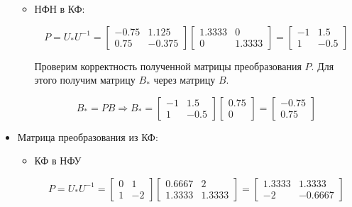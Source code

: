 \begin{itemize}
\begin{itemize}
	
	
	\item НФН в КФ:
	
	\begin{equation*}
	\text{$P=U_{*}U^{-1}=
	\begin{bmatrix}  -0.75  &  1.125 \\
    0.75  & -0.375 \end{bmatrix}
\begin{bmatrix} 1.3333   &      0 \\
         0  &  1.3333 \end{bmatrix}
=\begin{bmatrix}   -1 &    1.5 \\
    1  & -0.5 \end{bmatrix}$}
	\end{equation*}
	
	Проверим корректность полученной матрицы преобразования $P$. Для этого получим матрицу $B_{*}$ через матрицу $B$.
	
	\begin{equation*}
	\text{$B_{*}=PB$}
	\Longrightarrow
	\text{$B_{*}=
	\begin{bmatrix}   -1 &    1.5 \\
    1  & -0.5 \end{bmatrix}
\begin{bmatrix} 0.75 \\ 0 \end{bmatrix}
   =\begin{bmatrix} -0.75 \\ 0.75 \end{bmatrix}$}
	\end{equation*}
	

	\end{itemize}	
	
	\item Матрица преобразования из КФ:
	\begin{itemize}
	\item КФ в НФУ

\begin{equation*}
	\text{$P=U_{*}U^{-1}=
	\begin{bmatrix}
0 & 1\\ 1 & -2
\end{bmatrix}
\begin{bmatrix} 0.6667 &   2 \\
    1.3333  &  1.3333 \end{bmatrix}
=\begin{bmatrix}1.3333  &  1.3333 \\
   -2  & -0.6667\end{bmatrix}$}
	\end{equation*}
	

\end{itemize}
\end{itemize}
